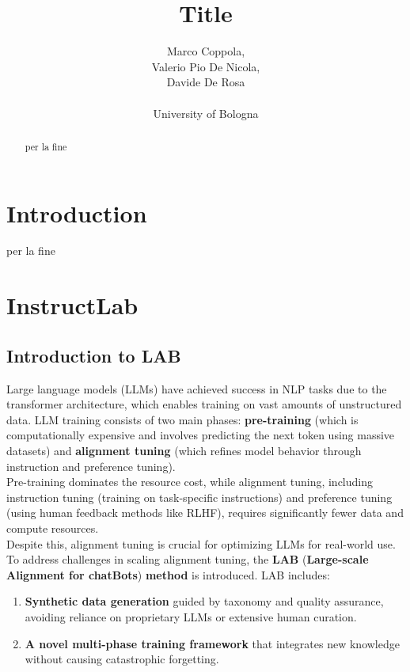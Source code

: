 \documentclass[12pt]{article}
\title{Title}
\author{Marco Coppola,\\
Valerio Pio De Nicola,\\
Davide De Rosa \\ \\
University of Bologna}
\date{}
\begin{document}
\maketitle

\begin{abstract}
per la fine
\end{abstract}

\section{Introduction}
per la fine

\section{InstructLab}
\subsection{Introduction to LAB}
Large language models (LLMs) have achieved success in NLP tasks due to the transformer architecture, which enables training on vast amounts of unstructured data. LLM training consists of two main phases: \textbf{pre-training} (which is computationally expensive and involves predicting the next token using massive datasets) and \textbf{alignment tuning} (which refines model behavior through instruction and preference tuning).\vspace{14pt}\\
Pre-training dominates the resource cost, while alignment tuning, including instruction tuning (training on task-specific instructions) and preference tuning (using human feedback methods like RLHF), requires significantly fewer data and compute resources.\\
Despite this, alignment tuning is crucial for optimizing LLMs for real-world use.\vspace{14pt}\\
To address challenges in scaling alignment tuning, the \textbf{LAB} (\textbf{Large-scale Alignment for chatBots}) \textbf{method} is introduced. LAB includes:
\begin{enumerate}
    \item \textbf{Synthetic data generation} guided by taxonomy and quality assurance, avoiding reliance on proprietary LLMs or extensive human curation.  
    \item \textbf{A novel multi-phase training framework} that integrates new knowledge without causing catastrophic forgetting.
\end{enumerate}
\end{document}
